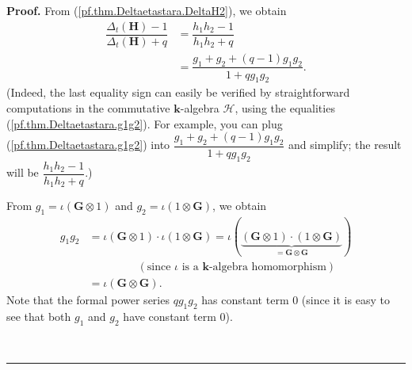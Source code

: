 \documentclass[numbers=enddot,12pt,final,onecolumn,notitlepage]{scrartcl}%
\theoremstyle{definition}
\newenvironment{proof}[1][Proof]{\noindent\textbf{#1.} }{\ \rule{0.5em}{0.5em}}
\begin{document}
\begin{proof}
From (\ref{pf.thm.Deltaetastara.DeltaH2}), we obtain%
\begin{align}
\dfrac{\Delta_{t}\left(  \mathbf{H}\right)  -1}{\Delta_{t}\left(
\mathbf{H}\right)  +q}  &  =\dfrac{h_{1}h_{2}-1}{h_{1}h_{2}+q}\nonumber\\
&  =\dfrac{g_{1}+g_{2}+\left(  q-1\right)  g_{1}g_{2}}{1+qg_{1}g_{2}}.
\label{pf.thm.Deltaetastara.abab2}%
\end{align}
(Indeed, the last equality sign can easily be verified by straightforward
computations in the commutative $\mathbf{k}$-algebra $\mathcal{H}$, using the
equalities (\ref{pf.thm.Deltaetastara.g1g2}). For example, you can plug
(\ref{pf.thm.Deltaetastara.g1g2}) into $\dfrac{g_{1}+g_{2}+\left(  q-1\right)
g_{1}g_{2}}{1+qg_{1}g_{2}}$ and simplify; the result will be $\dfrac
{h_{1}h_{2}-1}{h_{1}h_{2}+q}$.)

From $g_{1}=\iota\left(  \mathbf{G}\otimes1\right)  $ and $g_{2}=\iota\left(
1\otimes\mathbf{G}\right)  $, we obtain%
\begin{align}
g_{1}g_{2}  &  =\iota\left(  \mathbf{G}\otimes1\right)  \cdot\iota\left(
1\otimes\mathbf{G}\right)  =\iota\left(  \underbrace{\left(  \mathbf{G}%
\otimes1\right)  \cdot\left(  1\otimes\mathbf{G}\right)  }_{=\mathbf{G}%
\otimes\mathbf{G}}\right) \nonumber\\
&  \ \ \ \ \ \ \ \ \ \ \ \ \ \ \ \ \ \ \ \ \left(  \text{since }\iota\text{ is
a }\mathbf{k}\text{-algebra homomorphism}\right) \nonumber\\
&  =\iota\left(  \mathbf{G}\otimes\mathbf{G}\right)  .
\label{pf.thm.Deltaetastara.g1g2o}%
\end{align}
Note that the formal power series $qg_{1}g_{2}$ has constant term $0$ (since
it is easy to see that both $g_{1}$ and $g_{2}$ have constant term $0$).


\end{proof}
\end{document}
